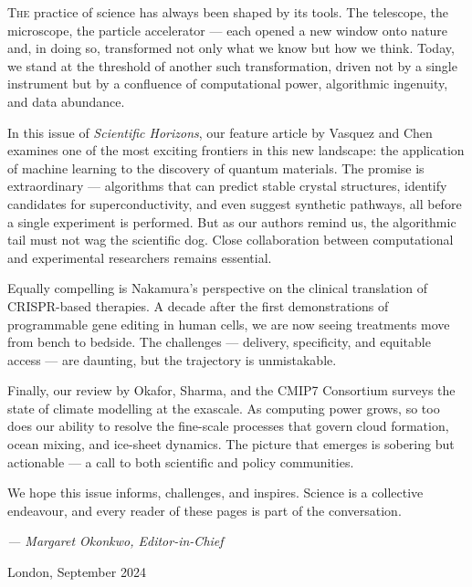 \documentclass[a4paper,11pt]{article}
\newcommand{\dropcap}[2]{%
  \lettrine[lines=3, lhang=0.25, loversize=0.08, findent=3pt, nindent=0pt]{#1}{#2}%
}
\begin{document}
\dropcap{T}{he} practice of science has always been shaped by its tools. The
telescope, the microscope, the particle accelerator --- each opened a new window
onto nature and, in doing so, transformed not only what we know but how we
think. Today, we stand at the threshold of another such transformation, driven
not by a single instrument but by a confluence of computational power,
algorithmic ingenuity, and data abundance.

\medskip
In this issue of \textit{Scientific Horizons}, our feature article by Vasquez
and Chen examines one of the most exciting frontiers in this new landscape: the
application of machine learning to the discovery of quantum materials. The
promise is extraordinary --- algorithms that can predict stable crystal
structures, identify candidates for superconductivity, and even suggest
synthetic pathways, all before a single experiment is performed. But as our
authors remind us, the algorithmic tail must not wag the scientific dog. Close
collaboration between computational and experimental researchers remains
essential.

\medskip
Equally compelling is Nakamura's perspective on the clinical translation of
CRISPR-based therapies. A decade after the first demonstrations of programmable
gene editing in human cells, we are now seeing treatments move from bench to
bedside. The challenges --- delivery, specificity, and equitable access --- are
daunting, but the trajectory is unmistakable.

\medskip
Finally, our review by Okafor, Sharma, and the CMIP7 Consortium surveys the
state of climate modelling at the exascale. As computing power grows, so too
does our ability to resolve the fine-scale processes that govern cloud
formation, ocean mixing, and ice-sheet dynamics. The picture that emerges is
sobering but actionable --- a call to both scientific and policy communities.

\medskip
We hope this issue informs, challenges, and inspires. Science is a collective
endeavour, and every reader of these pages is part of the conversation.

\vspace{10pt}
{\sffamily\itshape\color{graytext}--- Margaret Okonkwo, Editor-in-Chief}

\vspace{8pt}
{\sffamily\footnotesize\color{graytext}London, September 2024}

\newpage
\thispagestyle{empty}
\end{document}
